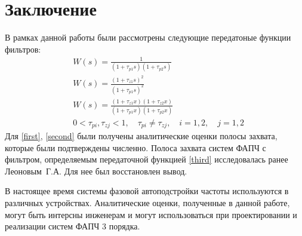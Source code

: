 \documentclass[a4paper,article,14pt]{extarticle}
\begin{document}
\pagebreak
\section{Заключение}
В рамках данной работы были рассмотрены следующие передатоные функции фильтров: 
 \begin{align}
&W(s) = \frac{1}{(1+\tau_{p1}s)(1+\tau_{p2}s)}\label{first}\\[5pt]
&W(s) = \frac{(1+\tau_{z1}s)^2}{(1+\tau_{p1}s)^2}\label{second}\\[5pt]
&W(s) = \frac{(1+\tau_{z1}x)(1+\tau_{z2}x)}{(1+\tau_{p1}x)(1+\tau_{p2}x)}\label{third}\\
&0<\tau_{pi},\tau_{zj} < 1, \quad \tau_{pi} \neq \tau_{zj}, \quad i=1,2, \quad j=1,2
 \end{align}
 Для \eqref{first}, \eqref{second} были получены аналитические оценки полосы захвата, которые были подтверждены численно. Полоса захвата систем ФАПЧ с фильтром, определяемым передаточной функцией \eqref{third} исследовалась ранее Леоновым~Г.\:А. Для нее был восстановлен вывод. 
 
 В настоящее время системы фазовой автоподстройки частоты используются в различных устройствах. Аналитические оценки, полученные в данной работе, могут быть интерсны инженерам и могут использоваться при проектировании и реализации систем ФАПЧ 3 порядка.
 
 \pagebreak
{}







 
\end{document}
